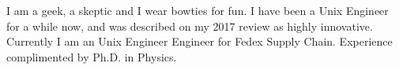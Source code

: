 

\begin{cvparagraph}


I am a geek, a skeptic and I wear bowties for fun.
I have been a Unix Engineer for a while now, and was described on my 2017 review as highly innovative.
Currently I am an Unix Engineer Engineer for Fedex Supply Chain.
Experience complimented by Ph.D. in Physics.







\end{cvparagraph}
